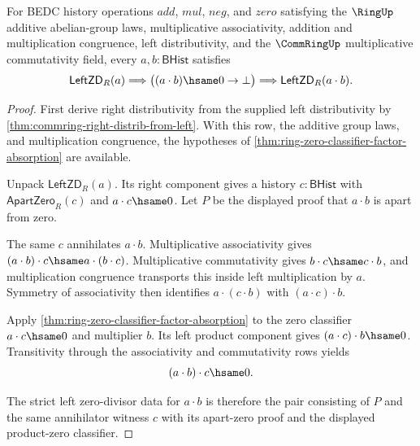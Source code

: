 \begin{theorem}
\label{thm:commring-zero-divisor-product-closure}
For BEDC history operations $add$, $mul$, $neg$, and $zero$ satisfying the
$\RingUp$ additive abelian-group laws, multiplicative associativity, addition
and multiplication congruence, left distributivity, and the $\CommRingUp$
multiplicative commutativity field, every $a,b:\mathsf{BHist}$ satisfies
$$
\mathsf{LeftZD}_R(a)
\Longrightarrow
\bigl((a\cdot b)\hsame0\to\bot\bigr)
\Longrightarrow
\mathsf{LeftZD}_R(a\cdot b).
$$
\end{theorem}
\begin{proof}
First derive right distributivity from the supplied left distributivity by
\autoref{thm:commring-right-distrib-from-left}. With this row, the additive
group laws, and multiplication congruence, the hypotheses of
\autoref{thm:ring-zero-classifier-factor-absorption} are available.

Unpack $\mathsf{LeftZD}_R(a)$. Its right component gives a history
$c:\mathsf{BHist}$ with $\mathsf{ApartZero}_R(c)$ and $a\cdot c\hsame0$. Let
$P$ be the displayed proof that $a\cdot b$ is apart from zero.

The same $c$ annihilates $a\cdot b$. Multiplicative associativity gives
$(a\cdot b)\cdot c\hsame a\cdot(b\cdot c)$. Multiplicative commutativity gives
$b\cdot c\hsame c\cdot b$, and multiplication congruence transports this inside
left multiplication by $a$. Symmetry of associativity then identifies
$a\cdot(c\cdot b)$ with $(a\cdot c)\cdot b$.

Apply \autoref{thm:ring-zero-classifier-factor-absorption} to the zero
classifier $a\cdot c\hsame0$ and multiplier $b$. Its left product component
gives $(a\cdot c)\cdot b\hsame0$. Transitivity through the associativity and
commutativity rows yields
$$
(a\cdot b)\cdot c\hsame0.
$$

The strict left zero-divisor data for $a\cdot b$ is therefore the pair
consisting of $P$ and the same annihilator witness $c$ with its apart-zero proof
and the displayed product-zero classifier.
\end{proof}

